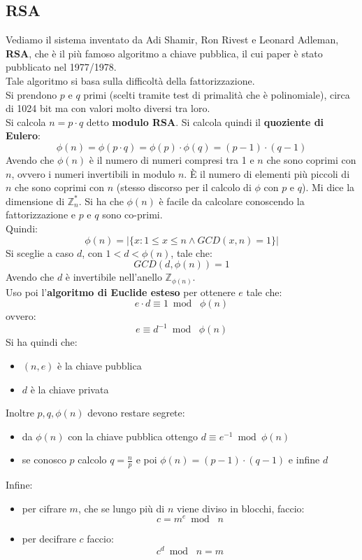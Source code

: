 \documentclass[a4paper,12pt, oneside]{book}
\begin{document}
\subsection{RSA}
Vediamo il sistema inventato da Adi Shamir, Ron Rivest e Leonard Adleman,
\textbf{RSA}, che è il più famoso algoritmo a chiave pubblica, il cui paper è
stato pubblicato nel 1977/1978.\\
Tale algoritmo si basa sulla difficoltà della fattorizzazione.\\
Si prendono $p$ e $q$ primi (scelti tramite test di primalità che è
polinomiale), circa di 1024 bit ma con valori molto 
diversi tra loro.\\
Si calcola $n=p\cdot q$ detto \textbf{modulo RSA}. Si calcola quindi il
\textbf{quoziente di Eulero}:
\[\phi(n)=\phi(p\cdot q)=\phi(p)\cdot \phi(q)=(p-1)\cdot (q-1)\]
Avendo che $\phi(n)$ è il numero di numeri compresi tra 1 e $n$ che sono coprimi
con $n$, ovvero i numeri invertibili in modulo $n$. È il numero di elementi più
piccoli di $n$ che sono coprimi con $n$ (stesso discorso per il calcolo di
$\phi$ con $p$ e $q$). Mi dice la dimensione di
$\mathbb{Z}_{n}^*$.
Si ha che $\phi(n)$ è facile da calcolare conoscendo la fattorizzazione e $p$ e
$q$ sono co-primi.\\
Quindi:
\[\phi(n)=|\{x:1\leq x\leq n\land GCD(x,n)=1\}|\]
Si sceglie a caso $d$, con $1<d<\phi(n)$, tale che:
\[GCD(d,\phi(n))=1\]
Avendo che $d$ è invertibile nell'anello $\mathbb{Z}_{\phi(n)}$.\\
Uso poi l'\textbf{algoritmo di Euclide esteso} per ottenere $e$ tale che:
\[e\cdot d\equiv 1\bmod \,\,\phi(n)\]
ovvero:
\[e\equiv d^{-1}\bmod\,\,\phi(n)\]
Si ha quindi che:
\begin{itemize}
  \item $(n,e)$ è la chiave pubblica
  \item $d$ è la chiave privata
\end{itemize}
Inoltre $p,q,\phi(n)$ devono restare segrete:
\begin{itemize}
  \item da $\phi(n)$ con la chiave pubblica ottengo $d\equiv e^{-1}\bmod\phi(n)$
  \item se conosco $p$ calcolo $q=\frac{n}{p}$ e poi $\phi(n)=(p-1)\cdot (q-1)$
  e infine $d$
\end{itemize}
Infine:
\begin{itemize}
  \item per cifrare $m$, che se lungo più di $n$ viene diviso in blocchi, faccio:
  \[c=m^e\bmod\,\,n\]
  \item per decifrare $c$ faccio:
  \[c^d\bmod\,\,n=m\]
\end{itemize}
\end{document}
